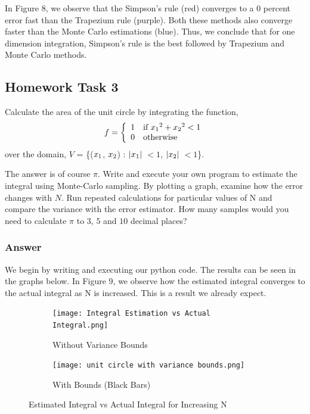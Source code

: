 \documentclass[12pt]{article}
\begin{document}
In Figure 8, we observe that the Simpson's rule (red) converges to a 0 percent error fast than the Trapezium rule (purple). Both these methods also converge faster than the Monte Carlo estimations (blue). Thus, we conclude that for one dimension integration, Simpson's rule is the best followed by Trapezium and Monte Carlo methods. 

\subsection*{Homework Task 3}

Calculate the area of the unit circle by integrating the function,
\begin{align}
f =
\left\{
	\begin{array}{ll}
		1  & \mbox{if } x\textsubscript{1}^2 + x\textsubscript{2}^2 < 1 \\
		0 & \mbox{otherwise}
	\end{array}
\right.
\end{align}
over the domain, $V$ = \{($x\textsubscript{1}$, $x\textsubscript{2}$) : $|x\textsubscript{1}|$ $< 1$, $|x\textsubscript{2}|$ $< 1$\}. 

The answer is of course $\pi$. Write and execute your own program to estimate the integral using Monte-Carlo sampling. By plotting a graph, examine how the error changes with $N$. Run repeated calculations for particular values of N and compare the variance with the error estimator. How many samples would you need to calculate $\pi$ to $3$, $5$ and $10$ decimal places?

\subsubsection*{Answer}

We begin by writing and executing our python code. The results can be seen in the graphs below. In Figure 9, we observe how the estimated integral converges to the actual integral as N is increased. This is a result we already expect.

\begin{figure}[h]
\begin{subfigure}{0.5\textwidth}
\texttt{[image: Integral Estimation vs Actual Integral.png]} 
\caption{Without Variance Bounds}
\label{fig:subim1}
\end{subfigure}
\begin{subfigure}{0.5\textwidth}
\texttt{[image: unit circle with variance bounds.png]}
\caption{With Bounds (Black Bars)}
\label{fig:subim2}
\end{subfigure}
\caption{Estimated Integral vs Actual Integral for Increasing N}
\label{fig:image2}
\end{figure}
\end{document}
